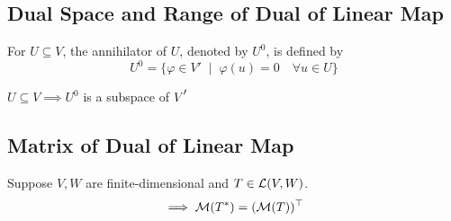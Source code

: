 \subsection{Dual Space and Range of Dual of Linear Map}
\begin{mydef}
  \label{def-annihiltator}
  For $U \subseteq V$, the annihilator of $U$, denoted by $U^{0}$, is defined by
  \begin{equation}
    U^0 = \{ \varphi \in V' \; \mid \; \varphi (u) = 0 \quad \forall u \in U \}
  \end{equation}
\end{mydef}

\setcounter{thm}{123}
\begin{thm}
  \label{the-annihilator-is-a-subspace}
  $U \subseteq V \implies U^{0}$ is a subspace of $V{\mathlarger{\mathlarger{'}}}$
\end{thm}


\subsection{Matrix of Dual of Linear Map}

\setcounter{thm}{131}
\begin{thm}
  Suppose $V, W$ are finite-dimensional and $T \in \mathcal{L}(V,W)$.
  \begin{equation}
    \implies \mathcal{M}(T^{*}) = (\mathcal{M}(T))^{\top}
  \end{equation}
\end{thm}

